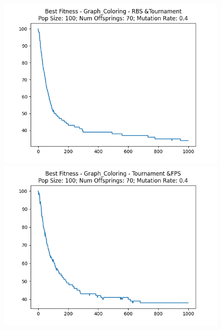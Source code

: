 \documentclass[12pt]{report}
\theoremstyle{mytheoremstyle}
\theoremstyle{mytheoremstyle}
\theoremstyle{myproblemstyle}
\begin{document}
\begin{figure}[!]
	\begin{minipage}{0.4\textwidth}
		\includegraphics[width=\linewidth]{../Analysis/BSF_Graph_Coloring_1_2_100_70.png}
	\end{minipage}
	\hspace{\fill}
	\begin{minipage}{0.4\textwidth}
		\includegraphics[width=\linewidth]{../Analysis/BSF_Graph_Coloring_2_0_100_70.png}
	\end{minipage}
	\vspace*{1cm}
	\begin{minipage}{0.4\textwidth}

\end{minipage}
\end{figure}
\end{document}
